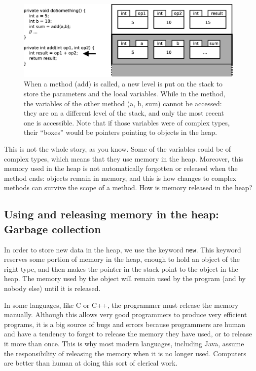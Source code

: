\begin{figure}[tbp]
  \centering
  \includegraphics[width=\textwidth]{gfx/parameter-stack}
  \caption{When a method (add) is called, a new level is put on the
    stack to store the parameters and the local variables. While in
    the method, the variables of the other method (a, b, sum) cannot
    be accessed: they are on a different level of the stack, and only
    the most recent one is accessible. Note that if those variables
    were of complex types, their ``boxes'' would be pointers pointing
    to objects in the heap.}
  \label{fig:stackparameter}
\end{figure}

This is not the whole story, as you know. Some of the variables could
be of complex types, which means that they use memory in the
heap. Moreover, this memory used in the heap is not automatically
forgotten or released when the method ends: objects remain in memory,
and this is how changes to complex methods can survive the scope of a
method. How is memory released in the heap?

\subsection{Using and releasing memory in the heap: Garbage collection}
\label{sec:garbage-collection}

In order to store new data in the heap, we use the keyword
\verb+new+. This keyword reserves some portion of memory in the heap,
enough to hold an object of the right type, and then makes the pointer
in the stack point to the object in the heap. The memory used by the
object will remain used by the program (and by nobody else) until it
is released. 

In some languages, like C or C++, the programmer must release the
memory manually. Although this allows very good programmers to produce
very efficient programs, it is a big source of bugs and errors because
programmers are human and have a tendency to forget to release the
memory they have used, or to release it more than once. This
is why most modern languages, including Java, assume the
responsibility of releasing the memory when it is no longer
used. Computers are better than human at doing this sort of clerical
work. 

